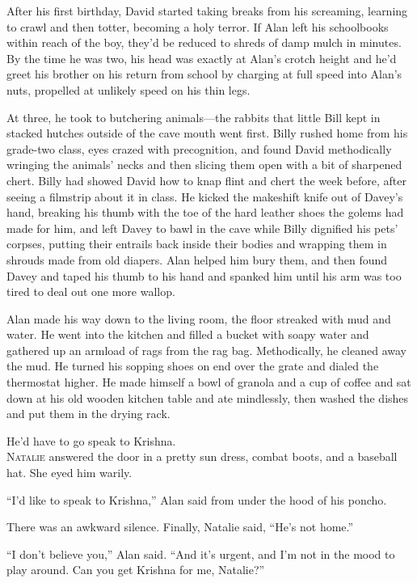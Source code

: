 \documentclass{article}
\begin{document}
After his first birthday, David started taking breaks from his
screaming, learning to crawl and then totter, becoming a holy terror. 
If Alan left his schoolbooks within reach of the boy, they'd be
reduced to shreds of damp mulch in minutes.  By the time he was two,
his head was exactly at Alan's crotch height and he'd greet his
brother on his return from school by charging at full speed into
Alan's nuts, propelled at unlikely speed on his thin legs.

At three, he took to butchering animals---the rabbits that little Bill
kept in stacked hutches outside of the cave mouth went first.  Billy
rushed home from his grade-two class, eyes crazed with precognition,
and found David methodically wringing the animals' necks and then
slicing them open with a bit of sharpened chert.  Billy had showed
David how to knap flint and chert the week before, after seeing a
filmstrip about it in class.  He kicked the makeshift knife out of
Davey's hand, breaking his thumb with the toe of the hard leather
shoes the golems had made for him, and left Davey to bawl in the cave
while Billy dignified his pets' corpses, putting their entrails back
inside their bodies and wrapping them in shrouds made from old
diapers.  Alan helped him bury them, and then found Davey and taped
his thumb to his hand and spanked him until his arm was too tired to
deal out one more wallop.

Alan made his way down to the living room, the floor streaked with mud
and water.  He went into the kitchen and filled a bucket with soapy
water and gathered up an armload of rags from the rag bag. 
Methodically, he cleaned away the mud.  He turned his sopping shoes on
end over the grate and dialed the thermostat higher.  He made himself
a bowl of granola and a cup of coffee and sat down at his old wooden
kitchen table and ate mindlessly, then washed the dishes and put them
in the drying rack.

He'd have to go speak to Krishna.
\\
\lettrine[lines=3, lhang=.5, nindent=0pt, findent=2pt]{N}{atalie} answered the door in a pretty sun dress, combat boots, and a
baseball hat.  She eyed him warily.

``I'd like to speak to Krishna,'' Alan said from under the hood of his
poncho.

There was an awkward silence.  Finally, Natalie said, ``He's not
home.''

``I don't believe you,'' Alan said.  ``And it's urgent, and I'm not in
the mood to play around.  Can you get Krishna for me, Natalie?''
\end{document}
